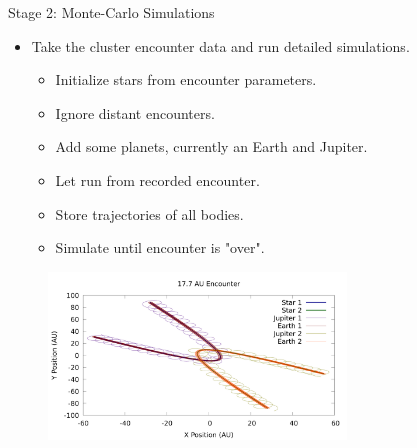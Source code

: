 \documentclass{beamer}
\begin{document}
\begin{frame}{Stage 2: Monte-Carlo Simulations}
    \begin{itemize}
        \item Take the cluster encounter data and run detailed simulations.
        \begin{itemize}
            \item Initialize stars from encounter parameters.
            \item Ignore distant encounters.
            \item Add some planets, currently an Earth and Jupiter.
            \item Let run from recorded encounter.
            \item Store trajectories of all bodies.
            \item Simulate until encounter is "over".
        \end{itemize}
    \end{itemize}
    \begin{figure}
        \centering
        \includegraphics[height=1.75in]{17_7_AU}
    \end{figure}
\end{frame}
\end{document}
